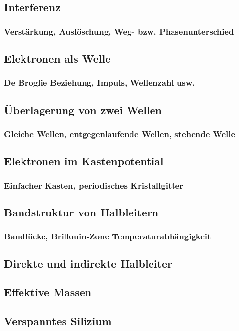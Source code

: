 \subsection{Interferenz}
	\subsubsection{Verstärkung, Auslöschung, Weg- bzw. Phasenunterschied}
\subsection{Elektronen als Welle}
	\subsubsection{De Broglie Beziehung, Impuls, Wellenzahl usw.}
\subsection{Überlagerung von zwei Wellen}
	\subsubsection{Gleiche Wellen, entgegenlaufende Wellen, stehende Welle}
\subsection{Elektronen im Kastenpotential}
	\subsubsection{Einfacher Kasten, periodisches Kristallgitter}
\subsection{Bandstruktur von Halbleitern}
	\subsubsection{Bandlücke, Brillouin-Zone
	Temperaturabhängigkeit}
\subsection{Direkte und indirekte Halbleiter}
\subsection{Effektive Massen}
\subsection{Verspanntes Silizium}
